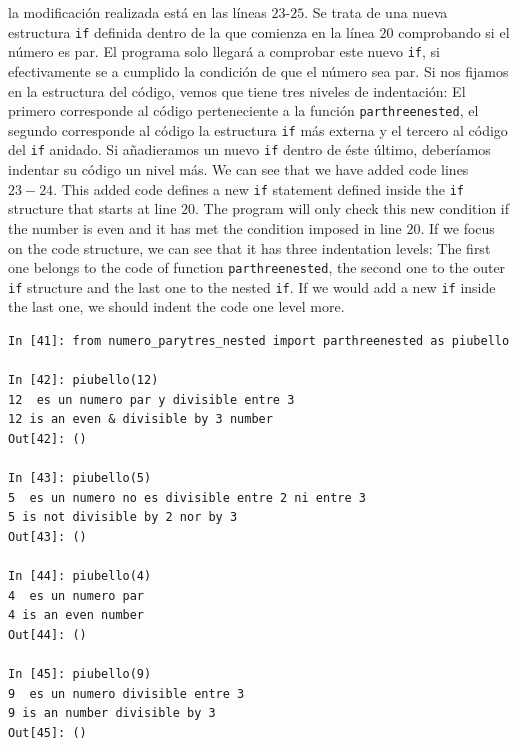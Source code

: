 \begin{paracol}{2}
la modificación realizada está en las líneas $23$-$25$. Se trata de una nueva estructura \texttt{if} definida dentro de la que comienza en la línea $20$ comprobando si el número es par. El programa solo llegará a comprobar este nuevo \texttt{if}, si efectivamente se a cumplido la condición de que el número sea par. Si nos fijamos en la estructura del código, vemos que tiene tres niveles de indentación: El primero corresponde al código perteneciente a la función \texttt{parthreenested}, el segundo corresponde al código la estructura \texttt{if} más externa y el tercero al código del \texttt{if} anidado. Si añadieramos un nuevo \texttt{if} dentro de éste último, deberíamos indentar su código un nivel más.
\switchcolumn
We can see that we have added code lines $23-24$. This added code defines a new \texttt{if} statement defined inside the \texttt{if} structure that starts at line $20$. The program will only check this new condition if the number is even and it has met the condition imposed in line $20$. If we focus on the code structure, we can see that it has three indentation levels: The first one belongs to the code of function \texttt{parthreenested}, the second one to the outer \texttt{if} structure and the last one to the nested \texttt{if}. If we would add a new \texttt{if} inside the last one, we should indent the code one level more. 
\end{paracol}

\begin{center}
    \begin{minipage}{.7\textwidth}
    \begin{verbatim}    
In [41]: from numero_parytres_nested import parthreenested as piubello

In [42]: piubello(12)
12  es un numero par y divisible entre 3
12 is an even & divisible by 3 number
Out[42]: ()

In [43]: piubello(5)
5  es un numero no es divisible entre 2 ni entre 3
5 is not divisible by 2 nor by 3 
Out[43]: ()

In [44]: piubello(4)
4  es un numero par
4 is an even number
Out[44]: ()

In [45]: piubello(9)
9  es un numero divisible entre 3
9 is an number divisible by 3
Out[45]: ()
\end{verbatim}
\end{minipage}
\end{center}

